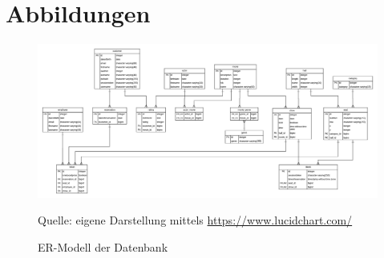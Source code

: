 \chapter{Abbildungen}
\begin{figure}
	\centering 
	\includegraphics[keepaspectratio, width=1.0\textwidth, height=1.0\textheight]{img/ER-Modell}
	\captionsetup{format=hang}
	\caption{\acs{ER-Modell} der Datenbank}
	\small Quelle: eigene Darstellung mittels \url{https://www.lucidchart.com/}
	\label{fig:Anhang_ER-Modell}
\end{figure}